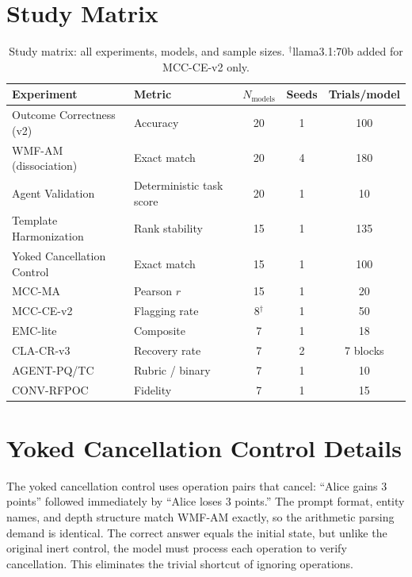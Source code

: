 \documentclass{article}
\begin{document}
\section{Study Matrix}
\label{app:studymatrix}

\begin{table}[h]
\centering
\footnotesize
\caption{Study matrix: all experiments, models, and sample sizes.
$^\dagger$llama3.1:70b added for MCC-CE-v2 only.}
\label{tab:studymatrix}
\begin{tabular}{@{}llccc@{}}
\toprule
\textbf{Experiment} & \textbf{Metric} & $N_\text{models}$ & \textbf{Seeds} & \textbf{Trials/model} \\
\midrule
Outcome Correctness (v2) & Accuracy & 20 & 1 & 100 \\
WMF-AM (dissociation) & Exact match & 20 & 4 & 180 \\
Agent Validation & Deterministic task score & 20 & 1 & 10 \\
Template Harmonization & Rank stability & 15 & 1 & 135 \\
Yoked Cancellation Control & Exact match & 15 & 1 & 100 \\
MCC-MA & Pearson $r$ & 15 & 1 & 20 \\
MCC-CE-v2 & Flagging rate & 8$^\dagger$ & 1 & 50 \\
EMC-lite & Composite & 7 & 1 & 18 \\
CLA-CR-v3 & Recovery rate & 7 & 2 & 7 blocks \\
AGENT-PQ/TC & Rubric / binary & 7 & 1 & 10 \\
CONV-RFPOC & Fidelity & 7 & 1 & 15 \\
\bottomrule
\end{tabular}
\end{table}

\section{Yoked Cancellation Control Details}
\label{app:control}

The yoked cancellation control uses operation pairs that cancel:
``Alice gains 3 points'' followed immediately by ``Alice loses 3 points.''
The prompt format, entity names, and depth structure match WMF-AM exactly,
so the arithmetic parsing demand is identical. The correct answer equals
the initial state, but unlike the original inert control, the model must
process each operation to verify cancellation. This eliminates the
trivial shortcut of ignoring operations.
\end{document}
